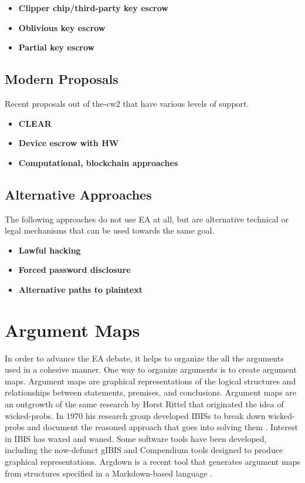 \newcommand{\propsstart}[0]{\begin{itemize}}
\newcommand{\prop}[2]{\item \textbf{#1} \cite{#2}} %
\newcommand{\propsend}{\end{itemize}}

\propsstart
    \prop{Clipper chip/third-party key escrow}{press_1993}
    \prop{Oblivious key escrow}{goos_oblivious_1996}
    \prop{Partial key escrow}{denning_taxonomy_1996}
\propsend


\subsection{Modern Proposals}

Recent proposals out of \ac{the-cw2} that have various levels of support.

\propsstart
    \prop{CLEAR}{ozzie_2018}
    \prop{Device escrow with HW}{savage_lawful_2018}
    \prop{Computational, blockchain approaches}{phan_key_2017}
\propsend


\subsection{Alternative Approaches}

The following approaches do not use \ac{EA} at all, but are alternative technical or legal mechanisms that can be used
towards the same goal.

\propsstart
    \prop{Lawful hacking}{nguyen_lawful_2017}
    \prop{Forced password disclosure}{kerr_encryption_2017}
    \prop{Alternative paths to plaintext}{kerr_encryption_2017}
\propsend

\section{Argument Maps}
\label{sec-arg-maps-intro}

In order to advance the \ac{EA} debate, it helps to organize the all the arguments used in a cohesive manner. One way to
organize arguments is to create argument maps. Argument maps are graphical representations of the logical structures and
relationships between statements, premises, and conclusions. Argument maps are an outgrowth of the same research by
Horst Rittel that originated the idea of \acp{wicked-prob}. In 1970 his research group developed \acp{IBIS} to break
down \acp{wicked-prob} and document the reasoned approach that goes into solving them \cite{kunz_issues_1970}. Interest
in \ac{IBIS} has waxed and waned. Some software tools have been developed, including the now-defunct gIBIS
\cite{conklin_gibis_1988} and Compendium \cite{dutoit_hypermedia_2006} tools designed to produce graphical
representations. Argdown is a recent tool that generates argument maps from structures specified in a Markdown-based
language \cite{voigt_argdown_2018}.

